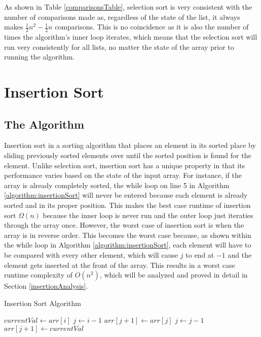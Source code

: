 \documentclass[letterpaper, 10pt,DIV=13]{scrartcl}
\numberwithin{equation}{section} %
\numberwithin{figure}{section} %
\numberwithin{table}{section} %
\begin{document}
As shown in Table \ref{comparisonsTable}, selection sort is very consistent with the number of comparisons made as, regardless of the state of the list, it always makes $\frac{1}{2}n^2 - \frac{1}{2}n$ comparisons. This is no coincidence as it is also the number of times the algorithm's inner loop iterates, which means that the selection sort will run very consistently for all lists, no matter the state of the array prior to running the algorithm.

\section{Insertion Sort}\label{insertionSortSection}
\subsection{The Algorithm}\label{insertionSortAlgo}
Insertion sort in a sorting algorithm that places an element in its sorted place by sliding previously sorted elements over until the sorted position is found for the element. Unlike selection sort, insertion sort has a unique property in that its performance varies based on the state of the input array. For instance, if the array is already completely sorted, the while loop on line 5 in Algorithm \ref{algorithm:insertionSort} will never be entered because each element is already sorted and in its proper position. This makes the best case runtime of insertion sort $\Omega(n)$ because the inner loop is never run and the outer loop just iteraties through the array once. However, the worst case of insertion sort is when the array is in reverse order. This becomes the worst case because, as shown within the while loop in Algorithm \ref{algorithm:insertionSort}, each element will have to be compared with every other element, which will cause $j$ to end at $-1$ and the element gets inserted at the front of the array. This results in a worst case runtime complexity of $O(n^2)$, which will be analyzed and proved in detail in Section \ref{insertionAnalysis}.

\begin{algorithm}
  \caption{Insertion Sort Algorithm}
  \label{algorithm:insertionSort}
  \begin{algorithmic}[1]
         
          \State $currentVal \gets arr[i]$
          \State $j \gets i - 1$
           
            \State $arr[j + 1] \gets arr[j]$ 
            \State $j \gets j - 1$
          \EndWhile
          \State $arr[j + 1] \gets currentVal$ 
        \EndFor
      \EndProcedure
  \end{algorithmic}
\end{algorithm}
\end{document}
